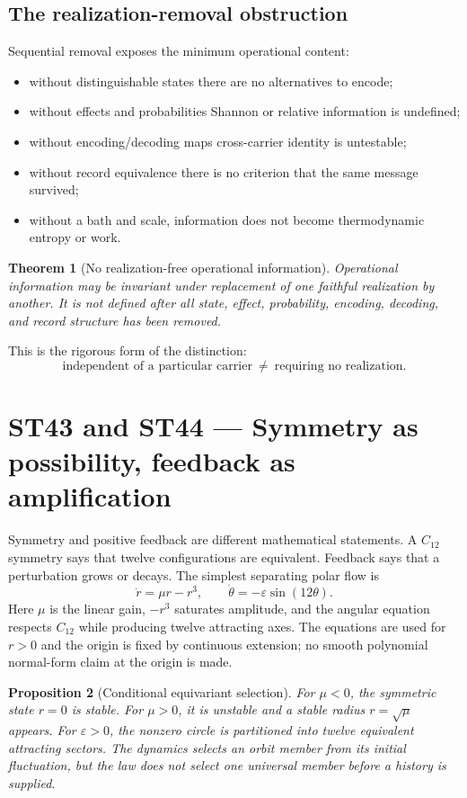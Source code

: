 \documentclass[11pt,a4paper]{article}
\newtheorem{theorem}{Theorem}[section]
\newtheorem{proposition}[theorem]{Proposition}
\begin{document}
\subsection{The realization-removal obstruction}

Sequential removal exposes the minimum operational content:
\begin{itemize}
\item without distinguishable states there are no alternatives to encode;
\item without effects and probabilities Shannon or relative information is undefined;
\item without encoding/decoding maps cross-carrier identity is untestable;
\item without record equivalence there is no criterion that the same message survived;
\item without a bath and scale, information does not become thermodynamic entropy or work.
\end{itemize}

\begin{theorem}[No realization-free operational information]
Operational information may be invariant under replacement of one faithful realization by another. It is not defined after all state, effect, probability, encoding, decoding, and record structure has been removed.
\end{theorem}

This is the rigorous form of the distinction:
\[
\boxed{\text{independent of a particular carrier}\ \ne\ \text{requiring no realization}.}
\]

\section{ST43 and ST44 --- Symmetry as possibility, feedback as amplification}

Symmetry and positive feedback are different mathematical statements. A $C_{12}$ symmetry says that twelve configurations are equivalent. Feedback says that a perturbation grows or decays. The simplest separating polar flow is
\[
\dot r=\mu r-r^3,\qquad
\dot\theta=-\varepsilon\sin(12\theta).
\]
Here $\mu$ is the linear gain, $-r^3$ saturates amplitude, and the angular equation respects $C_{12}$ while producing twelve attracting axes. The equations are used for $r>0$ and the origin is fixed by continuous extension; no smooth polynomial normal-form claim at the origin is made.

\begin{proposition}[Conditional equivariant selection]
For $\mu<0$, the symmetric state $r=0$ is stable. For $\mu>0$, it is unstable and a stable radius $r=\sqrt\mu$ appears. For $\varepsilon>0$, the nonzero circle is partitioned into twelve equivalent attracting sectors. The dynamics selects an orbit member from its initial fluctuation, but the law does not select one universal member before a history is supplied.
\end{proposition}
\end{document}
